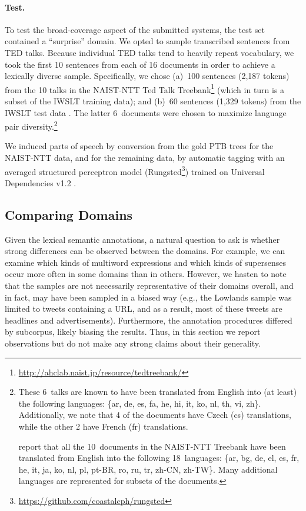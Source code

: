 \documentclass[11pt,letterpaper]{article}
\begin{document}
\paragraph{Test.}
To test the broad-coverage aspect of the submitted systems, the test set contained a ``surprise'' domain. 
We opted to sample transcribed sentences from TED talks. 
Because individual TED talks tend to heavily repeat vocabulary, we took the first 10 sentences 
from each of 16 documents in order to achieve a lexically diverse sample. 
Specifically, we chose 
(a)~100 sentences (2,187 tokens) from the 10 talks in the 
NAIST-NTT Ted Talk Treebank\footnote{\url{http://ahclab.naist.jp/resource/tedtreebank/}} \citep{neubig-2014naist} 
(which in turn is a subset of the IWSLT training data); 
and (b)~60 sentences (1,329 tokens) from the IWSLT test data \citep{cettolo-2012wit3}.
The latter 6~documents were chosen to maximize language pair diversity.\footnote{These 6~talks
are known to have been translated from English into (at least) the following languages: 
\{ar, de, es, fa, he, hi, it, ko, nl, th, vi, zh\}. Additionally, we note that 4 of the documents have Czech (cs) 
translations, while the other 2 have French (fr) translations.

report that all the 10~documents in the NAIST-NTT Treebank have been translated from English into the following 
18~languages: \{ar, bg, de, el, es, fr, he, it, ja, ko, nl, pl, \mbox{pt-BR}, ro, ru, tr, \mbox{zh-CN}, \mbox{zh-TW}\}. 
Many additional languages are represented for subsets of the documents.}


We induced parts of speech by conversion from the gold PTB trees for the NAIST-NTT data, 
and for the remaining data, by automatic tagging with an averaged structured perceptron model (Rungsted\footnote{\url{https://github.com/coastalcph/rungsted}}) 
trained on Universal Dependencies v1.2 \citep{nivre-15}.

\subsection{Comparing Domains}

Given the lexical semantic annotations, 
a natural question to ask is whether strong differences can be observed between the domains.
For example, we can examine which kinds of multiword expressions and which kinds of supersenses 
occur more often in some domains than in others. 
However, we hasten to note that the samples are not necessarily representative of their domains overall, 
and in fact, may have been sampled in a biased way (e.g., the Lowlands sample was limited to tweets containing a URL, 
and as a result, most of these tweets are headlines and advertisements).
Furthermore, the annotation procedures differed by subcorpus, likely biasing the results.
Thus, in this section we report observations but do not make any strong claims about their generality.
\end{document}
